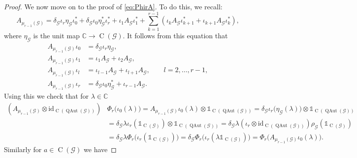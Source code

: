 \documentclass[11pt,reqno]{amsart}
\newcommand{\id}{\mathrm{id}}
\newcommand{\I}{\mathds{1}}
\newcommand{\tens}{\otimes}
\newcommand{\CC}{\mathbb{C}}
\DeclareMathOperator{\QAut}{QAut}
\DeclareMathOperator{\C}{C}
\begin{document}
\begin{proof}
We now move on to the proof of \eqref{eq:PhirA}. To do this, we recall:
\[
A_{\scriptscriptstyle\mu_{r-1}(\mathcal{G})}=\delta_{\scriptscriptstyle\mathcal{G}}\iota_r\eta_{\scriptscriptstyle\mathcal{G}}\iota_0^*
+\delta_{\scriptscriptstyle\mathcal{G}}\iota_0\eta_{\scriptscriptstyle\mathcal{G}}^*\iota_r^*+\iota_1A_{\scriptscriptstyle\mathcal{G}}\iota_1^*
+\sum_{k=1}^{r-1}(\iota_kA_{\scriptscriptstyle\mathcal{G}}\iota_{k+1}^*+\iota_{k+1}A_{\scriptscriptstyle\mathcal{G}}\iota_k^*),
\]
where $\eta_{\scriptscriptstyle\mathcal{G}}$ is the unit map $\CC\to\C(\mathcal{G})$. It follows from this equation that
\begin{align*}
A_{\scriptscriptstyle\mu_{r-1}(\mathcal{G})}\iota_0&=\delta_{\scriptscriptstyle\mathcal{G}}\iota_r\eta_{\scriptscriptstyle\mathcal{G}},\\
A_{\scriptscriptstyle\mu_{r-1}(\mathcal{G})}\iota_1&=\iota_1A_{\scriptscriptstyle\mathcal{G}}+\iota_2A_{\scriptscriptstyle\mathcal{G}},\\
A_{\scriptscriptstyle\mu_{r-1}(\mathcal{G})}\iota_l&=\iota_{l-1}A_{\scriptscriptstyle\mathcal{G}}+\iota_{l+1}A_{\scriptscriptstyle\mathcal{G}},\qquad l=2,\dotsc,r-1,\\
A_{\scriptscriptstyle\mu_{r-1}(\mathcal{G})}\iota_r&=\delta_{\scriptscriptstyle\mathcal{G}}\iota_0\eta_{\scriptscriptstyle\mathcal{G}}^*+\iota_{r-1}A_{\scriptscriptstyle\mathcal{G}}.
\end{align*}
Using this we check that for $\lambda\in\CC$
\begin{align*}
(A_{\scriptscriptstyle\mu_{r-1}(\mathcal{G})}\tens\id_{\C(\QAut(\mathcal{G}))})
&\Phi_r\bigl(\iota_0(\lambda)\bigr)
=A_{\scriptscriptstyle\mu_{r-1}(\mathcal{G})}\iota_0(\lambda)\tens\I_{\C(\QAut(\mathcal{G}))}
=\delta_{\scriptscriptstyle\mathcal{G}}
\iota_r\bigl(\eta_{\scriptscriptstyle\mathcal{G}}(\lambda)\bigr)\tens\I_{\C(\QAut(\mathcal{G}))}\\
&=\delta_{\scriptscriptstyle\mathcal{G}}\lambda
\iota_r(\I_{\C(\mathcal{G})})\tens\I_{\C(\QAut(\mathcal{G}))}
=\delta_{\scriptscriptstyle\mathcal{G}}\lambda
(\iota_r\tens\id_{\C(\QAut(\mathcal{G}))})\rho_{\scriptscriptstyle\mathcal{G}}(\I_{\C(\mathcal{G})})\\
&=\delta_{\scriptscriptstyle\mathcal{G}}\lambda\Phi_r
\bigl(\iota_r(\I_{\C(\mathcal{G})})\bigr)
=\delta_{\scriptscriptstyle\mathcal{G}}\Phi_r
\bigl(\iota_r(\lambda\I_{\C(\mathcal{G})})\bigr)
=\Phi_r\bigl(A_{\scriptscriptstyle\mu_{r-1}(\mathcal{G})}\iota_0(\lambda)\bigr).
\end{align*}
Similarly for $a\in\C(\mathcal{G})$ we have

\end{proof}
\end{document}
